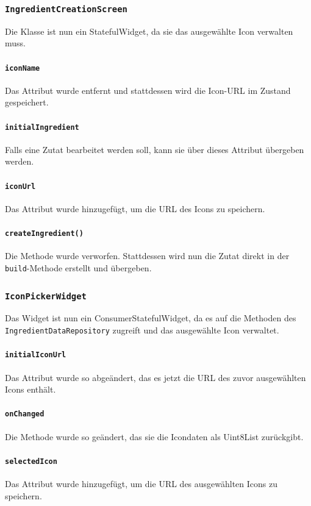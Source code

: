 \documentclass{implementierungsheft}
\begin{document}
\subsubsection*{\texttt{IngredientCreationScreen}}
Die Klasse ist nun ein StatefulWidget, da sie das ausgewählte Icon verwalten muss.
\paragraph{\texttt{iconName}}
Das Attribut wurde entfernt und stattdessen wird die Icon-URL im Zustand gespeichert.
\paragraph*{\texttt{initialIngredient}}
Falls eine Zutat bearbeitet werden soll, kann sie über dieses Attribut übergeben werden.
\paragraph{\texttt{iconUrl}}
Das Attribut wurde hinzugefügt, um die URL des Icons zu speichern.
\paragraph{\texttt{createIngredient()}}
Die Methode wurde verworfen. Stattdessen wird nun die Zutat direkt in der \texttt{build}-Methode erstellt und übergeben.
\subsubsection*{\texttt{IconPickerWidget}}
Das Widget ist nun ein ConsumerStatefulWidget, da es auf die Methoden des \texttt{IngredientData\-Repository} zugreift und das ausgewählte Icon verwaltet.
\paragraph{\texttt{initialIconUrl}} Das Attribut wurde so abgeändert, das es jetzt die URL des zuvor ausgewählten Icons enthält.
\paragraph{\texttt{onChanged}} Die Methode wurde so geändert, das sie die Icondaten als Uint8List zurückgibt.
\paragraph{\texttt{selectedIcon}} Das Attribut wurde hinzugefügt, um die URL des ausgewählten Icons zu speichern.
\end{document}
